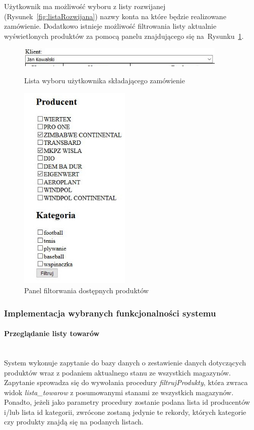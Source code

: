 \documentclass[a4paper, 12pt]{article}
\newcommand{\snippet}[3]{



}
\begin{document}
Użytkownik ma możliwość wyboru z listy rozwijanej (Rysunek~\ref{fig:listaRozwijana}) nazwy konta na które będzie realizowane zamówienie. Dodatkowo istnieje możliwość filtrowania listy aktualnie wyświetlonych produktów za pomocą panelu znajdującego się na~Rysunku~\ref{fig:panelFiltrowaniaProduktów}.

\snippet{PHP}{polaczenieZBaza.php}{Połączenie z bazą danych z poziomu PHP}

\begin{figure}[H]
	\centering
	\includegraphics[width=10cm]{Screeny/listaRozwijana.JPG}
	\caption[Lista wyboru użytkownika]{Lista wyboru użytkownika składającego zamówienie}
	\label{fig:listaRozwijana}
	
	\centering
	\includegraphics[height=10cm]{Screeny/panelFiltrowania.JPG}
	\caption[Panel filtorwania dostępnych produktów]{Panel filtorwania dostępnych produktów}
	\label{fig:panelFiltrowaniaProduktów}
\end{figure}

\subsubsection{Implementacja wybranych funkcjonalności systemu}
\paragraph{Przeglądanie listy towarów} \mbox{}\\
System wykonuje zapytanie do bazy danych o zestawienie danych dotyczących produktów wraz z podaniem aktualnego stanu ze wszystkich magazynów. Zapytanie sprowadza się do wywołania procedury \textit{filtrujProdukty}, która zwraca widok \textit{lista\_towarow} z posumowanymi stanami ze wszystkich magazynów. Ponadto, jeżeli jako parametry procedury zostanie podana lista id producentów i/lub lista id kategorii, zwrócone zostaną jedynie te rekordy, których kategorie czy produkty znajdą się na podanych listach.
\end{document}
